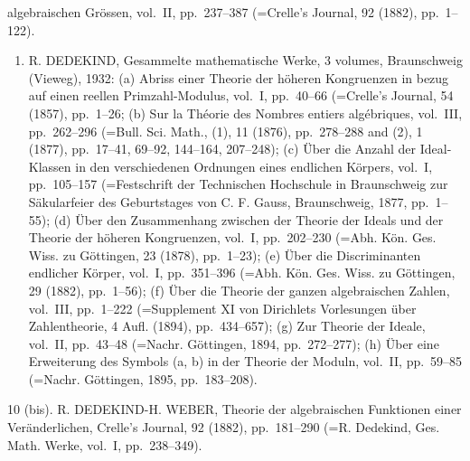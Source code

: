 algebraischen Grössen, vol.~II, pp.~237--387 (=Crelle's Journal, 92 (1882), pp.~1--122).

\begin{enumerate}
\def\labelenumi{\arabic{enumi}.}
\setcounter{enumi}{9}
\tightlist
\item
  R. DEDEKIND, Gesammelte mathematische Werke, 3 volumes, Braunschweig (Vieweg), 1932: (a) Abriss einer Theorie der höheren Kongruenzen in bezug auf einen reellen Primzahl-Modulus, vol.~I, pp.~40--66 (=Crelle's Journal, 54 (1857), pp.~1--26; (b) Sur la Théorie des Nombres entiers algébriques, vol.~III, pp.~262--296 (=Bull. Sci. Math., (1), 11 (1876), pp.~278--288 and (2), 1 (1877), pp.~17--41, 69--92, 144--164, 207--248); (c) Über die Anzahl der Ideal-Klassen in den verschiedenen Ordnungen eines endlichen Körpers, vol.~I, pp.~105--157 (=Festschrift der Technischen Hochschule in Braunschweig zur Säkularfeier des Geburtstages von C. F. Gauss, Braunschweig, 1877, pp.~1--55); (d) Über den Zusammenhang zwischen der Theorie der Ideals und der Theorie der höheren Kongruenzen, vol.~I, pp.~202--230 (=Abh. Kön. Ges. Wiss. zu Göttingen, 23 (1878), pp.~1--23); (e) Über die Discriminanten endlicher Körper, vol.~I, pp.~351--396 (=Abh. Kön. Ges. Wiss. zu Göttingen, 29 (1882), pp.~1--56); (f) Über die Theorie der ganzen algebraischen Zahlen, vol.~III, pp.~1--222 (=Supplement XI von Dirichlets Vorlesungen über Zahlentheorie, 4 Aufl. (1894), pp.~434--657); (g) Zur Theorie der Ideale, vol.~II, pp.~43--48 (=Nachr. Göttingen, 1894, pp.~272--277); (h) Über eine Erweiterung des Symbols (a, b) in der Theorie der Moduln, vol.~II, pp.~59--85 (=Nachr. Göttingen, 1895, pp.~183--208).
\end{enumerate}

10 (bis). R. DEDEKIND-H. WEBER, Theorie der algebraischen Funktionen einer Veränderlichen, Crelle's Journal, 92 (1882), pp.~181--290 (=R. Dedekind, Ges. Math. Werke, vol.~I, pp.~238--349).

